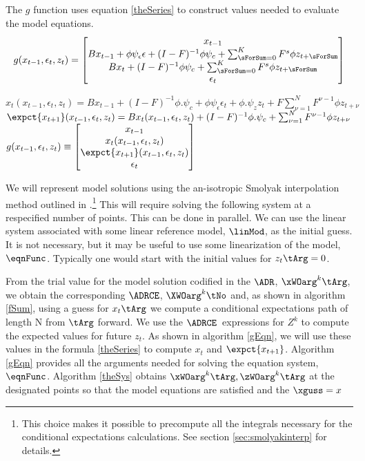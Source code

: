 \documentclass[12pt]{article}
\begin{document}
The $g$ function uses equation \ref{theSeries} to construct values needed to evaluate the model equations.
\begin{gather}
  g(x_{t-1},\epsilon_t,z_t)=
  \begin{bmatrix}
    x_{t-1}\\
B x_{t-1}+ \phi \psi_\epsilon\epsilon + (I - F)^{-1} \phi \psi_c + \sum_{\sForSum=0}^K F^s \phi z_{t+\sForSum} \\
B x_{t}+   (I - F)^{-1} \phi \psi_c + \sum_{\sForSum=0}^K F^s \phi z_{t+\sForSum} \\
\epsilon_t
  \end{bmatrix}
\end{gather}
\begin{algorithm}
$x_t(x_{t-1},\epsilon_t,z_t)=B x_{t-1} + (I-F)^{-1} \phi. \psi_c+\phi \psi_\epsilon \epsilon_t + \phi . \psi_z z_t + F\sum_{\nu=1}^N F^{\nu-1} \phi z_{t+\nu} $\;
$\expct{x_{t+1}}(x_{t-1},\epsilon_t,z_t)=B x_{t}(x_{t-1},\epsilon_t,z_t) + (I-F)^{-1} \phi. \psi_c + \sum_{\nu=1}^N F^{\nu-1} \phi z_{t+\nu} $\;
$g(x_{t-1},\epsilon_t,z_t)\equiv
\begin{bmatrix}
  x_{t-1}\\x_t(x_{t-1},\epsilon_t,z_t)\\\expct{x_{t+1}}(x_{t-1},\epsilon_t,z_t)\\ \epsilon_t
\end{bmatrix}
$\;
\caption{$\modArgs(\linMod,\sum_{\nu=1}^N F^{\nu-1} \phi z_{t+\nu})$}
\label{gEqn}
\end{algorithm}

We will represent model solutions using the an-isotropic Smolyak interpolation method outlined in \cite{Judd2014}.\footnote{ This choice makes it possible to precompute all the integrals necessary for the conditional expectations calculations. See section \ref{sec:smolyakinterp} for details.}  This will require solving
the following system at a respecified number of points.  This can be done in parallel. We can use the linear system associated with some 
linear reference model, $\linMod$, as the initial guess.  
It is not necessary, but it may be useful to use some linearization of the model, $\eqnFunc$.  Typically one would start with the initial values for $z_t\tArg=0$.

From the  trial value for the model solution codified in the $\ADR$, $\xWOarg^k\tArg$, we obtain the corresponding $\ADRCE$, $\XWOarg^k\tNo$ and, as
 shown in algorithm \ref{fSum}, using
a guess for $x_t\tArg$ we compute a conditional expectations path of length N from $\tArg$ forward.  We use the $\ADRCE$\ expressions for $Z^k$ to compute the expected values for future $z_t$. As shown in algorithm \ref{gEqn}, we 
will use these values in the formula \ref{theSeries} to compute $x_t$ and $\expct{x_{t+1}}$. Algorithm \ref{gEqn} provides all the arguments needed for solving the equation system, $\eqnFunc$.  Algorithm \ref{theSys} obtains  $\xWOarg^k\tArg,\zWOarg^k\tArg$ at the designated points so that the model equations are satisfied and the $\xguss=x$
\end{document}

